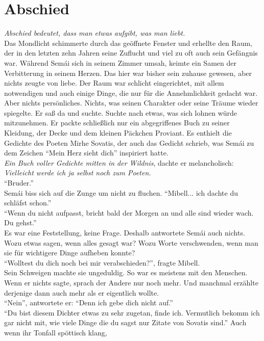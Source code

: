 \chapter{Abschied}


\textit{Abschied bedeutet, dass man etwas aufgibt, was man liebt.}\\
Das Mondlicht schimmerte durch das geöffnete Fenster und erhellte den Raum, der in den letzten zehn 
Jahren seine Zuflucht und viel zu oft auch sein Gefängnis war. Während Semái sich in seinem Zimmer 
umsah, keimte ein Samen der Verbitterung in seinem Herzen. Das hier war bisher sein zuhause 
gewesen, aber nichts zeugte von liebe. Der Raum war schlicht eingerichtet, mit allem notwendigen 
und auch einige Dinge, die nur für die Annehmlichkeit gedacht war. Aber nichts persönliches. 
Nichts, was seinen Charakter oder seine Träume wieder spiegelte. Er saß da und suchte. Suchte nach 
etwas, was sich lohnen würde mitzunehmen. Er packte schließlich nur ein abgegriffenes Buch zu 
seiner Kleidung, der Decke und dem kleinen Päckchen Proviant. Es enthielt die Gedichte des Poeten 
Mirhe Sovatis, der auch das Gedicht schrieb, was Semái zu dem Zeichen ``Mein Herz sieht dich'' 
inspiriert hatte. \\
\textit{Ein Buch voller Gedichte mitten in der Wildnis}, dachte er melancholisch: 
\textit{Vielleicht werde ich ja selbst noch zum Poeten.}\\
``Bruder.''\\
Semái biss sich auf die Zunge um nicht zu fluchen. ``Mibell... ich dachte du schläfst schon.''\\
``Wenn du nicht aufpasst, bricht bald der Morgen an und alle sind wieder wach. Du gehst.''\\
Es war eine Feststellung, keine Frage. Deshalb antwortete Semái auch nichts. Wozu etwas sagen, wenn 
alles gesagt war? Wozu Worte verschwenden, wenn man sie für wichtigere Dinge aufheben konnte?\\
``Wolltest du dich noch bei mir verabschieden?'', fragte Mibell. \\
Sein Schweigen machte sie ungeduldig. So war es meistens mit den Menschen. Wenn er nichts sagte, 
sprach der Andere nur noch mehr. Und manchmal erzählte derjenige dann auch mehr als er eigentlich 
wollte. \\
``Nein'', antwortete er: ``Denn ich gebe dich nicht auf.''\\
``Du bist diesem Dichter etwas zu sehr zugetan, finde ich. Vermutlich bekomm ich gar nicht mit, wie 
viele Dinge die du sagst nur Zitate von Sovatis sind.'' Auch wenn ihr Tonfall spöttisch klang, 
